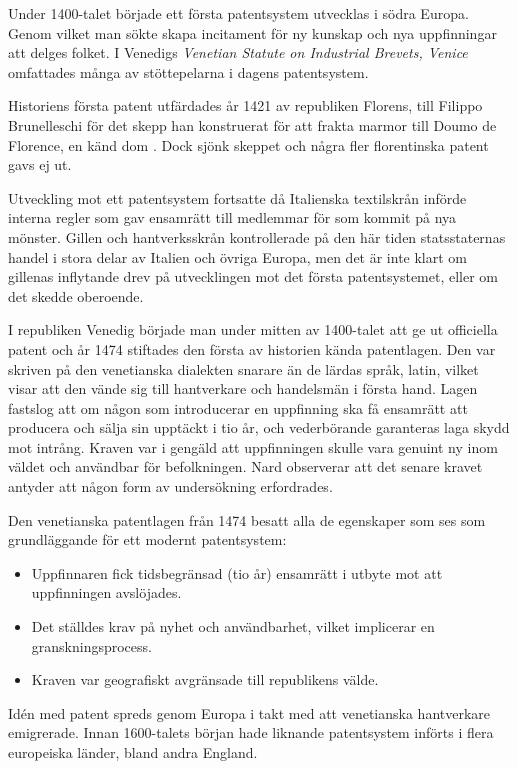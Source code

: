 Under 1400-talet började ett första patentsystem utvecklas i södra Europa.
Genom vilket man sökte skapa incitament för ny kunskap och nya uppfinningar att delges folket. 
I Venedigs \emph{Venetian Statute on Industrial Brevets, Venice} omfattades många av stöttepelarna i dagens patentsystem\cite{nard}.

Historiens första patent utfärdades år 1421 av republiken Florens, till Filippo Brunelleschi för det skepp han konstruerat för att frakta marmor till Doumo de Florence, en känd dom \cite{frumkin}. 
Dock sjönk skeppet och några fler florentinska patent gavs ej ut.

Utveckling mot ett patentsystem fortsatte då Italienska textilskrån införde interna regler som gav ensamrätt till medlemmar för som kommit på nya mönster.
Gillen och hantverksskrån kontrollerade på den här tiden statsstaternas handel i stora delar av Italien och övriga Europa, men det är inte klart om gillenas inflytande drev på utvecklingen mot det första patentsystemet, eller om det skedde oberoende.

I republiken Venedig började man under mitten av 1400-talet att ge ut officiella patent och år 1474 stiftades den första av historien kända patentlagen\cite{frumkin}.
Den var skriven på den venetianska dialekten snarare än de lärdas språk, latin, vilket visar att den vände sig till hantverkare och handelsmän i första hand.
Lagen fastslog att om någon som introducerar en uppfinning ska få ensamrätt att producera och sälja sin upptäckt i tio år, och vederbörande garanteras laga skydd mot intrång. 
Kraven var i gengäld att uppfinningen skulle vara genuint ny inom väldet och användbar för befolkningen. 
Nard observerar att det senare kravet antyder att någon form av undersökning erfordrades\cite{nard}. 

Den venetianska patentlagen från 1474 besatt alla de egenskaper som ses som grundläggande för ett modernt patentsystem\cite{nard}:

\begin{itemize}
    \item Uppfinnaren fick tidsbegränsad (tio år) ensamrätt i utbyte mot att uppfinningen avslöjades.
    \item Det ställdes krav på nyhet och användbarhet, vilket implicerar en granskningsprocess.
    \item Kraven var geografiskt avgränsade till republikens välde.
\end{itemize}

Idén med patent spreds genom Europa i takt med att venetianska hantverkare emigrerade. 
Innan 1600-talets början hade liknande patentsystem införts i flera europeiska länder, bland andra England.
